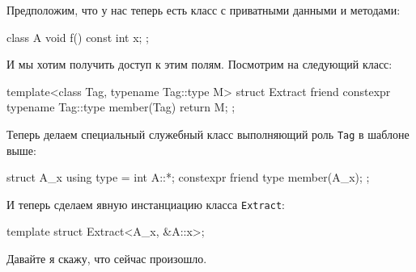 Предположим, что у нас теперь есть класс с приватными данными и методами:
\begin{cppcode}
class A {
  void f() const {}
  int x;
};
\end{cppcode}
И мы хотим получить доступ к этим полям.
Посмотрим на следующий класс:
\begin{cppcode}
template<class Tag, typename Tag::type M>
struct Extract {
  friend constexpr typename Tag::type member(Tag) {
    return M;
  }
};
\end{cppcode}
Теперь делаем специальный служебный класс выполняющий роль \verb"Tag" в шаблоне выше:
\begin{cppcode}
struct A_x {
  using type = int A::*;
  constexpr friend type member(A_x);
};
\end{cppcode}
И теперь сделаем явную инстанциацию класса \verb"Extract":
\begin{cppcode}[\nonumbers]
template struct Extract<A_x, &A::x>;
\end{cppcode}	
Давайте я скажу, что сейчас произошло.
